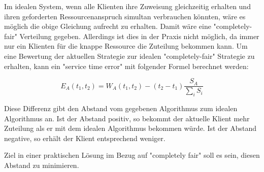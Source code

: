 Im idealen System, wenn alle Klienten ihre Zuweisung gleichzeitig erhalten und ihren geforderten Ressourcenanspruch simultan verbrauchen könnten, wäre es möglich die obige Gleichung aufrecht zu erhalten.
Damit wäre eine "completely-fair" Verteilung gegeben. Allerdings ist dies in der Praxis nicht möglich, da immer nur ein Klienten für die knappe Ressource die Zuteilung bekommen kann.
Um eine Bewertung der aktuellen Strategie zur idealen "completely-fair" Strategie zu erhalten, kann ein "service time error" mit folgender Formel berechnet werden:

\begin{equation}
E_A(t_1,t_2) = W_A(t_1,t_2) - (t_2 - t_1) \frac{S_A}{\sum_i S_i}
\label{eq:perfect_fairness}
\end{equation}

Diese Differenz gibt den Abstand vom gegebenen Algorithmus zum idealen Algorithmus an.
Ist der Abstand positiv, so bekommt der aktuelle Klient mehr Zuteilung als er mit dem idealen Algorithmus bekommen würde. Ist der Abstand negative, so erhält der Klient entsprechend weniger.

Ziel in einer praktischen Lösung im Bezug auf "completely fair" soll es sein, diesen Abstand zu minimieren.
 



